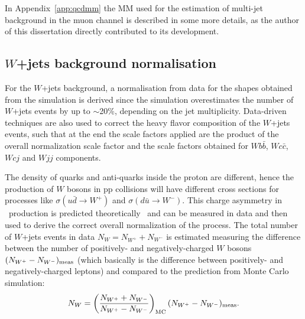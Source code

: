 In Appendix~\ref{app:qcdmm} the MM used for the estimation
of multi-jet background in the muon channel is
described in some more details, as the author of this dissertation
directly contributed to its development.


\subsection{$W$+jets background normalisation}\label{sec:Wjetsnorm}
 
For the $W$+jets background, a normalisation from data for the shapes 
obtained from the simulation is derived since the simulation 
overestimates the number of $W$+jets events
by up to $\sim$20\%, depending on the jet multiplicity.
Data-driven techniques are also used to correct the heavy flavor 
composition of the $W$+jets events, such that at the end the scale
factors applied are the product of the overall normalization scale factor
and the scale factors obtained for $Wb\bar{b}$, $Wc\bar{c}$, $Wcj$ and $Wjj$
components.

The density of quarks and anti-quarks inside the proton are different, hence 
the production of $W$ bosons in pp collisions will have different 
cross sections for processes like
$\sigma(u\bar{d}\to W^+)$ and $\sigma(d\bar{u}\to W^-)$. This charge
asymmetry in \wjets\ production is predicted theoretically~\cite{wasym}
and can be measured in data and then used to derive the correct
overall normalization of the process.
The total number of $W$+jets events in data $N_W=N_{W^+}+N_{W^-}$
is estimated measuring the difference between the number 
of positively- and negatively-charged $W$
bosons $(N_{W^+}-N_{W^-})_{\rm meas}$ (which basically is
the difference between positively- and negatively-charged leptons)
and compared to the prediction from Monte Carlo simulation:
\begin{equation}
N_W = \left(\frac{N_{W^+}+N_{W^-}}{N_{W^+}-N_{W^-}}\right )_{\rm MC}(N_{W^+}-N_{W^-})_{\rm meas}.
\label{eq:nw}
\end{equation}


